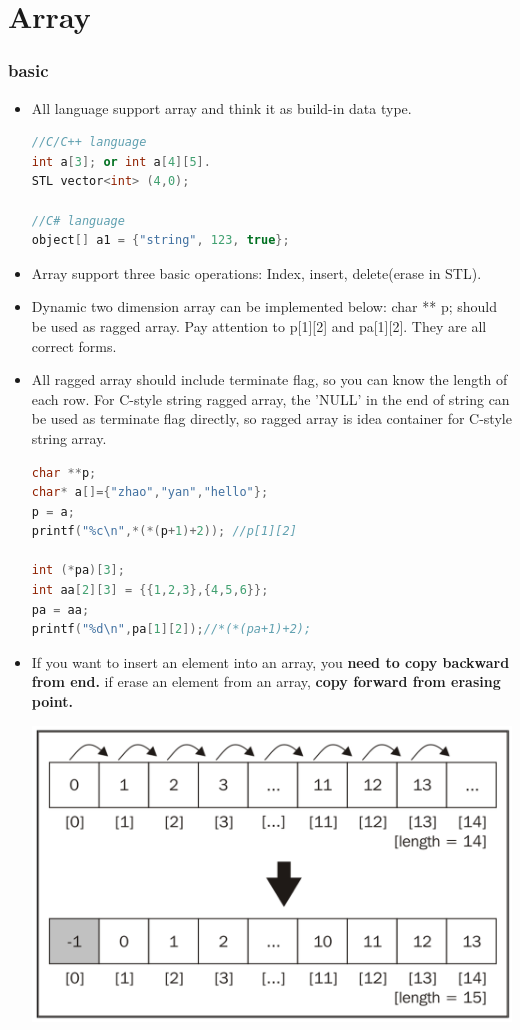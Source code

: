 \documentclass[a4paper,12pt,twoside]{book}
\begin{document}
\section{Array}
\subsubsection{basic}
\begin{itemize}
\item All language support array and think it as build-in data type.  
\begin{lstlisting}[frame=single, language=c++]
//C/C++ language
int a[3]; or int a[4][5].  
STL vector<int> (4,0);
  
//C# language 
object[] a1 = {"string", 123, true};
\end{lstlisting}

\item Array support three basic operations: Index, insert, delete(erase in STL).  

\item Dynamic two dimension array can be implemented below:  char ** p; should be used as ragged array. Pay attention to p[1][2] and pa[1][2]. They are all correct forms.

\item All ragged array should include terminate flag, so you can know the length of each row.  For C-style string ragged array, the 'NULL' in the end of string can be used as terminate flag directly, so ragged array is idea container for C-style string array. 

\begin{lstlisting}[frame=single, language=c++]
char **p;
char* a[]={"zhao","yan","hello"};
p = a;
printf("%c\n",*(*(p+1)+2)); //p[1][2]

int (*pa)[3];
int aa[2][3] = {{1,2,3},{4,5,6}};
pa = aa;
printf("%d\n",pa[1][2]);//*(*(pa+1)+2);
\end{lstlisting} 

\item If you want to insert an element into an array, you  \textbf{need to copy backward from end. }
if erase an element from an array, \textbf{copy forward from erasing point.}

\includegraphics[scale=0.35]{pics/array_insert.png} \newline


\end{itemize}
\end{document}

